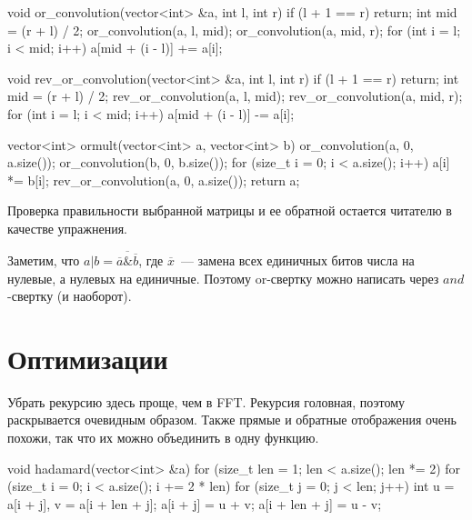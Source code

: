 \begin{code}
    
void or_convolution(vector<int> &a, int l, int r) {
    if (l + 1 == r) {
        return;
    }
    int mid = (r + l) / 2;
    or_convolution(a, l, mid);
    or_convolution(a, mid, r);
    for (int i = l; i < mid; i++) {
        a[mid + (i - l)] += a[i];
    }
}

void rev_or_convolution(vector<int> &a, int l, int r) {
    if (l + 1 == r) {
        return;
    }
    int mid = (r + l) / 2;
    rev_or_convolution(a, l, mid);
    rev_or_convolution(a, mid, r);
    for (int i = l; i < mid; i++) {
        a[mid + (i - l)] -= a[i];
    }
}

vector<int> ormult(vector<int> a, vector<int> b) {
    or_convolution(a, 0, a.size());
    or_convolution(b, 0, b.size());
    for (size_t i = 0; i < a.size(); i++) {
        a[i] *= b[i];
    }
    rev_or_convolution(a, 0, a.size());
    return a;
}

\end{code}



Проверка правильности выбранной матрицы и ее обратной остается читателю в качестве упражнения.

\begin{observation}
\label{adamar: orand}
    Заметим, что $a | b = \overline{\overline{a} \& \overline{b}}$, где $\overline{x}$~--- замена всех единичных битов числа
    на нулевые, а нулевых на единичные. Поэтому or-свертку можно написать через $and$-свертку (и наоборот).
\end{observation}


\section{Оптимизации}

Убрать рекурсию здесь проще, чем в FFT. Рекурсия головная, поэтому раскрывается очевидным образом.
Также прямые и обратные отображения очень похожи, так что их можно объединить в одну функцию.

\begin{code}
void hadamard(vector<int> &a) {
    for (size_t len = 1; len < a.size(); len *= 2) {
        for (size_t i = 0; i < a.size(); i += 2 * len) {
            for (size_t j = 0; j < len; j++) {
                int u = a[i + j], v = a[i + len + j];
                a[i + j] = u + v;
                a[i + len + j] = u - v;
            }
        }
    }
}
\end{code}

